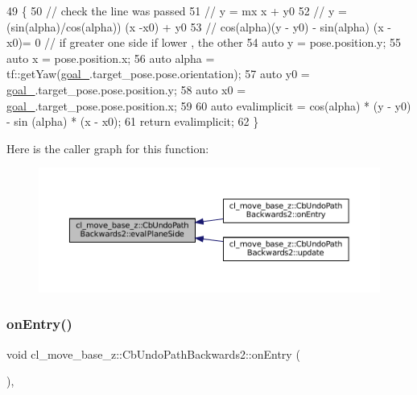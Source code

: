\begin{DoxyCode}
49 \{
50   \textcolor{comment}{// check the line was passed}
51   \textcolor{comment}{// y = mx x + y0}
52   \textcolor{comment}{// y = (sin(alpha)/cos(alpha)) (x -x0) + y0}
53   \textcolor{comment}{// cos(alpha)(y - y0) - sin(alpha) (x -x0)= 0 // if greater one side if lower , the other}
54   \textcolor{keyword}{auto} y = pose.position.y;
55   \textcolor{keyword}{auto} x = pose.position.x;
56   \textcolor{keyword}{auto} alpha = tf::getYaw(\hyperlink{classcl__move__base__z_1_1CbUndoPathBackwards2_ad119c38ee9cb341c9b468682d1794538}{goal\_}.target\_pose.pose.orientation);
57   \textcolor{keyword}{auto} y0 = \hyperlink{classcl__move__base__z_1_1CbUndoPathBackwards2_ad119c38ee9cb341c9b468682d1794538}{goal\_}.target\_pose.pose.position.y;
58   \textcolor{keyword}{auto} x0 = \hyperlink{classcl__move__base__z_1_1CbUndoPathBackwards2_ad119c38ee9cb341c9b468682d1794538}{goal\_}.target\_pose.pose.position.x;
59 
60   \textcolor{keyword}{auto} evalimplicit = cos(alpha) * (y - y0) - sin (alpha) * (x - x0);
61   \textcolor{keywordflow}{return} evalimplicit;
62 \}
\end{DoxyCode}
Here is the caller graph for this function\+:
\nopagebreak
\begin{figure}[H]
\begin{center}
\leavevmode
\includegraphics[width=350pt]{classcl__move__base__z_1_1CbUndoPathBackwards2_a20b9a6799b0484810b0319f5a97d020e_icgraph}
\end{center}
\end{figure}
\mbox{\label{classcl__move__base__z_1_1CbUndoPathBackwards2_a1b96187df9be6ce0fbdb5511147685d3}} 
\subsubsection{\texorpdfstring{on\+Entry()}{onEntry()}}
{\footnotesize\ttfamily void cl\+\_\+move\+\_\+base\+\_\+z\+::\+Cb\+Undo\+Path\+Backwards2\+::on\+Entry (\begin{DoxyParamCaption}{ }\end{DoxyParamCaption})\hspace{0.3cm}{\ttfamily [override]}, {\ttfamily [virtual]}}



